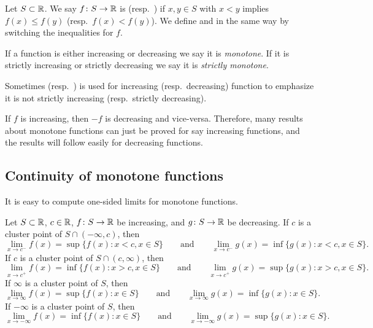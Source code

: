 
\begin{defn}
Let $S \subset {\mathbb{R}}$.
We say $f \colon S \to {\mathbb{R}}$ is \emph{}
(resp.\  \emph{}) if $x,y \in S$ with
$x < y$ implies $f(x) \leq f(y)$ (resp.\ $f(x) < f(y)$).
We define
\emph{} and
\emph{} in the same way by switching the
inequalities for $f$.

If a function is either increasing or decreasing we say it is
\emph{monotone}.  If it is
strictly increasing or strictly decreasing we say it is
\emph{strictly monotone}.
\end{defn}

Sometimes \emph{}
(resp.\ \emph{}) is used
for increasing (resp.\ decreasing) function to emphasize it is not
strictly increasing (resp.\ strictly decreasing).

If $f$ is increasing, then $-f$ is decreasing and vice-versa.  Therefore,
many results about monotone functions can just be proved for say increasing
functions, and the results will follow easily for decreasing functions.

\subsection{Continuity of monotone functions}

It is easy to compute one-sided limits for monotone functions.

\begin{prop} \label{prop:monotlimits}
Let $S \subset {\mathbb{R}}$, $c \in {\mathbb{R}}$,
$f \colon S \to {\mathbb{R}}$ be increasing,
and
$g \colon S \to {\mathbb{R}}$ be decreasing.
If $c$ is a cluster point of $S \cap (-\infty,c)$, then
\begin{equation*}
\lim_{x \to c^-} f(x) = \sup \{ f(x) : x < c, x \in S \}
\qquad \text{and} \qquad
\lim_{x \to c^-} g(x) = \inf \{ g(x) : x < c, x \in S \} .
\end{equation*}
If $c$ is a cluster point of $S \cap (c,\infty)$, then
\begin{equation*}
\lim_{x \to c^+} f(x) = \inf \{ f(x) : x > c, x \in S \}
\qquad \text{and} \qquad
\lim_{x \to c^+} g(x) = \sup \{ g(x) : x > c, x \in S \} .
\end{equation*}
If $\infty$ is a cluster point of $S$, then
\begin{equation*}
\lim_{x \to \infty} f(x) = \sup \{ f(x) : x \in S \}
\qquad \text{and} \qquad
\lim_{x \to \infty} g(x) = \inf \{ g(x) : x \in S \} .
\end{equation*}
If $-\infty$ is a cluster point of $S$, then
\begin{equation*}
\lim_{x \to -\infty} f(x) = \inf \{ f(x) : x \in S \}
\qquad \text{and} \qquad
\lim_{x \to -\infty} g(x) = \sup \{ g(x) : x \in S \} .
\end{equation*}
\end{prop}

